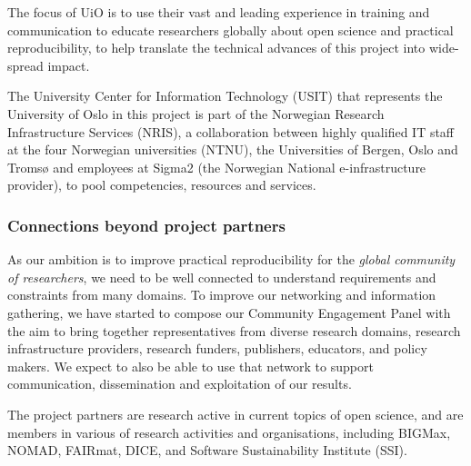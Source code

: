 The focus of UiO is to use their vast and leading experience in training
and communication to educate researchers globally about open science and
practical reproducibility, to help translate the technical advances of this
project into wide-spread impact.

The University Center for Information Technology (USIT) that represents the University of Oslo in this 
project is part of the Norwegian Research Infrastructure Services (NRIS), 
a collaboration between highly qualified IT staff at the four Norwegian universities (NTNU), the 
Universities of Bergen, Oslo and Tromsø and employees at Sigma2 (the Norwegian National e-infrastructure provider),
 to pool competencies, resources and services.

\subsubsection{Connections beyond project partners}

As our ambition is to improve practical reproducibility for the \emph{global
  community of researchers}, we need to be well connected to understand
requirements and constraints from many domains. To improve our networking and
information gathering, we have started to compose our Community Engagement Panel
 with the aim to bring together
representatives from diverse research domains, research infrastructure
providers, research funders, publishers, educators, and policy makers. We expect
to also be able to use that network to support communication, dissemination and
exploitation of our results.

The project partners are research active in current topics of open science, and
are members in various of research activities and organisations, including
BIGMax, NOMAD, FAIRmat, DICE, and Software Sustainability Institute (SSI).


% 
